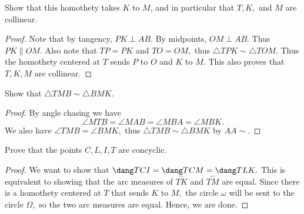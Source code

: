 \documentclass[letterpaper,oneside]{scrartcl}
\begin{document}
\begin{problem*}
  [4.31]
  Show that this homothety takes $K$ to $M$, and in particular that $T,K,$ and $M$ are collinear.
\end{problem*}
\begin{proof}
  Note that by tangency, $PK \perp AB.$ By midpoints, $OM \perp AB.$ Thus $PK \parallel OM.$ Also note that $TP=PK$ and $TO=OM,$ thus $\triangle TPK \sim \triangle TOM.$ Thus the homothety centered at $T$ sends $P$ to $O$ and $K$ to $M.$ This also proves that $T,K,M$ are collinear. 
\end{proof}
\begin{problem*}
  [4.32]
  Show that $\triangle TMB \sim \triangle BMK.$
\end{problem*}
\begin{proof}
  By angle chasing we have
  $$\angle MTB = \angle MAB = \angle MBA = \angle MBK.$$
  We also have $\angle TMB = \angle BMK,$ thus $\triangle TMB \sim \triangle BMK$ by $AA\sim$.
\end{proof}
\begin{problem*}
  [4.34]
  Prove that the points $C,L,I,T$ are concyclic.
\end{problem*}
\begin{proof}
  We want to show that $\dang TCI = \dang TCM = \dang TLK.$ This is equivalent to showing that the arc measures of $\overset{\frown}{TK}$ and $\overset{\frown}{TM}$ are equal. Since there is a homothety centered at $T$ that sends $K$ to $M,$ the circle $\omega$ will be sent to the circle $\Omega,$ so the two arc measures are equal. Hence, we are done.
\end{proof}
\end{document}
